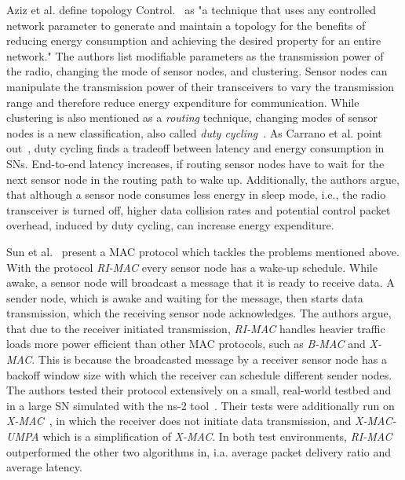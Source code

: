 Aziz et al. define topology Control.~\cite{aziz2013survey} as "a technique that
uses any controlled network parameter to generate and maintain a topology for
the benefits of reducing energy consumption and achieving the desired property
for an entire network." The authors list modifiable parameters as the
transmission power of the radio, changing the mode of sensor nodes, and
clustering. Sensor nodes can manipulate the transmission power of their
transceivers to vary the transmission range and therefore reduce energy
expenditure for communication. While clustering is also mentioned as a
\textit{routing} technique, changing modes of sensor nodes is a new
classification, also called \textit{duty cycling}~\cite{carrano2014survey,
lin2004medium, buettner2006x}. As Carrano et al. point
out~\cite{carrano2014survey}, duty cycling finds a tradeoff between latency and
energy consumption in \acp{SN}. End-to-end latency increases, if routing sensor
nodes have to wait for the next sensor node in the routing path to wake up.
Additionally, the authors argue, that although a sensor node consumes less
energy in sleep mode, i.e., the radio transceiver is turned off, higher data
collision rates and potential control packet overhead, induced by duty cycling,
can increase energy expenditure.

Sun et al.~\cite{sun2008ri} present a \ac{MAC} protocol which tackles the
problems mentioned above. With the protocol \textit{RI-MAC} every sensor node
has a wake-up schedule. While awake, a sensor node will broadcast a message
that it is ready to receive data. A sender node, which is awake and waiting for
the message, then starts data transmission, which the receiving sensor node
acknowledges. The authors argue, that due to the receiver initiated
transmission, \textit{RI-MAC} handles heavier traffic loads more power
efficient than other \ac{MAC} protocols, such as \textit{B-MAC} and
\textit{X-MAC}. This is because the broadcasted message by a receiver sensor
node has a backoff window size with which the receiver can schedule different
sender nodes. The authors tested their protocol extensively on a small,
real-world testbed and in a large \ac{SN} simulated with the ns-2
tool~\cite{bajaj1999improving}. Their tests were additionally run on
\textit{X-MAC}~\cite{buettner2006x}, in which the receiver does not initiate
data transmission, and \textit{X-MAC-UMPA} which is a simplification of
\textit{X-MAC}. In both test environments, \textit{RI-MAC} outperformed the
other two algorithms in, i.a. average packet delivery ratio and average
latency.

